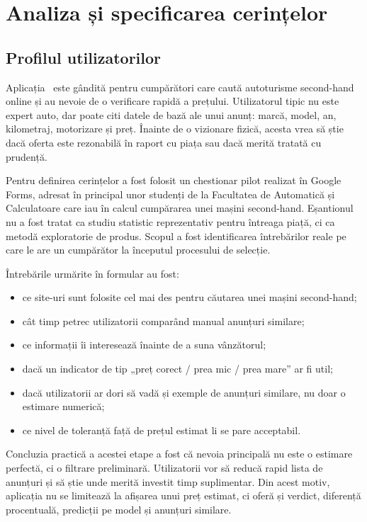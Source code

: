 \chapter{Analiza și specificarea cerințelor}
\label{chapter:requirements}

\section{Profilul utilizatorilor}
\label{sec:req-users}

Aplicația \project\ este gândită pentru cumpărători care caută autoturisme second-hand online și au nevoie de o verificare rapidă a prețului. Utilizatorul tipic nu este expert auto, dar poate citi datele de bază ale unui anunț: marcă, model, an, kilometraj, motorizare și preț. Înainte de o vizionare fizică, acesta vrea să știe dacă oferta este rezonabilă în raport cu piața sau dacă merită tratată cu prudență.

Pentru definirea cerințelor a fost folosit un chestionar pilot realizat în Google Forms, adresat în principal unor studenți de la Facultatea de Automatică și Calculatoare care iau în calcul cumpărarea unei mașini second-hand. Eșantionul nu a fost tratat ca studiu statistic reprezentativ pentru întreaga piață, ci ca metodă exploratorie de produs. Scopul a fost identificarea întrebărilor reale pe care le are un cumpărător la începutul procesului de selecție.

Întrebările urmărite în formular au fost:

\begin{itemize}
    \item ce site-uri sunt folosite cel mai des pentru căutarea unei mașini second-hand;
    \item cât timp petrec utilizatorii comparând manual anunțuri similare;
    \item ce informații îi interesează înainte de a suna vânzătorul;
    \item dacă un indicator de tip „preț corect / prea mic / prea mare” ar fi util;
    \item dacă utilizatorii ar dori să vadă și exemple de anunțuri similare, nu doar o estimare numerică;
    \item ce nivel de toleranță față de prețul estimat li se pare acceptabil.
\end{itemize}

Concluzia practică a acestei etape a fost că nevoia principală nu este o estimare perfectă, ci o filtrare preliminară. Utilizatorii vor să reducă rapid lista de anunțuri și să știe unde merită investit timp suplimentar. Din acest motiv, aplicația nu se limitează la afișarea unui preț estimat, ci oferă și verdict, diferență procentuală, predicții pe model și anunțuri similare.

